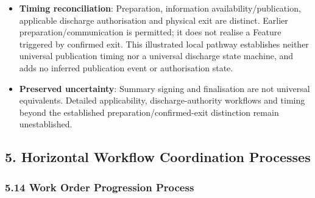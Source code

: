 \begin{itemize}
\begin{itemize}
\item 
\texttt{}: Confirmed physical exit triggers departure notifications, updated bed-state communication and finalised-summary dispatch to external care providers under \texttt{}; care-place turnover follows its own responsibility.



\end{itemize}


\item 
\textbf{Timing reconciliation}: Preparation, information availability/\allowbreak{}publication, applicable discharge authorisation and physical exit are distinct. Earlier preparation/\allowbreak{}communication is permitted; it does not realise a Feature triggered by confirmed exit. This illustrated local pathway establishes neither universal publication timing nor a universal discharge state machine, and adds no inferred publication event or authorisation state.



\item 
\textbf{Preserved uncertainty}: Summary signing and finalisation are not universal equivalents. Detailed applicability, discharge-authority workflows and timing beyond the established preparation/\allowbreak{}confirmed-exit distinction remain unestablished.



\end{itemize}
\label{rad:processes:278}

\par\smallskip
{}\label{rad:processes:280}
\subsection*{5. Horizontal Workflow Coordination Processes}
\label{rad:processes:282}
\subsubsection*{5.14 Work Order Progression Process}
\label{rad:processes:283}


